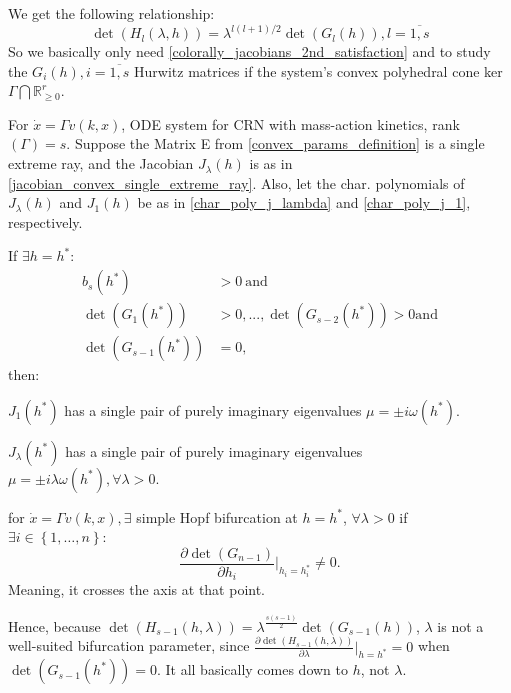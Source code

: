 \begin{proposition}
	We get the following relationship:
	\[
		\det\left(H_l(\lambda,h)\right)=\lambda^{l(l+1)/2}\det\left(G_l(h)\right),l=\overline{1,s}
	\]
	So we basically only need \ref{colorally_jacobians_2nd_satisfaction} and to study the $G_i(h), i = \overline{1,s}$ Hurwitz matrices if the system's convex polyhedral cone ker$\Gamma \bigcap \mathbb{R}^r_{\geq 0}$.
\end{proposition}
\begin{proposition}
	For $\dot{x} = \Gamma v(k,x)$, ODE system for CRN with mass-action kinetics, rank$(\Gamma) = s$. Suppose the Matrix E from \ref{convex_params_definition} is a single extreme ray, and the Jacobian $J_\lambda(h)$ is as in \ref{jacobian_convex_single_extreme_ray}.
	Also, let the char. polynomials of $J_\lambda(h)$ and $J_1(h)$ be as in \ref{char_poly_j_lambda} and \ref{char_poly_j_1}, respectively.

	If $\exists h = h^* :$
	\[
		\begin{aligned}
			b_s(h^*)&\mathrm{>0~and}\\\det(G_1(h^*))&>0,...,\det(G_{s-2}(h^*))>0\mathrm{and}\\\det(G_{s-1}(h^*))&=0,
		\end{aligned}
	\]
	then:

	 $J_1(h^*)$ has a single pair of purely imaginary eigenvalues $\mu = \pm i \omega(h^*)$.

	 $J_\lambda(h^*)$ has a single pair of purely imaginary eigenvalues $\mu = \pm i \lambda \omega(h^*), \forall \lambda > 0$.

	 for $\dot{x} = \Gamma v(k,x), \exists$ simple Hopf	 bifurcation at $h = h^*$, $\forall \lambda > 0$ if $\exists i \in \left\{ 1 , \ldots , n \right\}:$
	\[
		\frac{\partial\det(G_{n-1})}{\partial h_i}|_{h_i=h_i^*}\neq0.
	\]
	Meaning, it crosses the axis at that point.
\end{proposition}
Hence, because $\det(H_{s-1}(h,\lambda))=\lambda^{\frac{s(s-1)}{2}}\det(G_{s-1}(h))$, $\lambda$ is not a well-suited bifurcation parameter, since $\frac{\partial\det(H_{s-1}(h,\lambda))}{\partial\lambda}|_{h=h^{*}}=0$ when $\det(G_{s-1}(h^{*}))=0$. It all basically comes down to $h$, not $\lambda$.
\hfill\break

